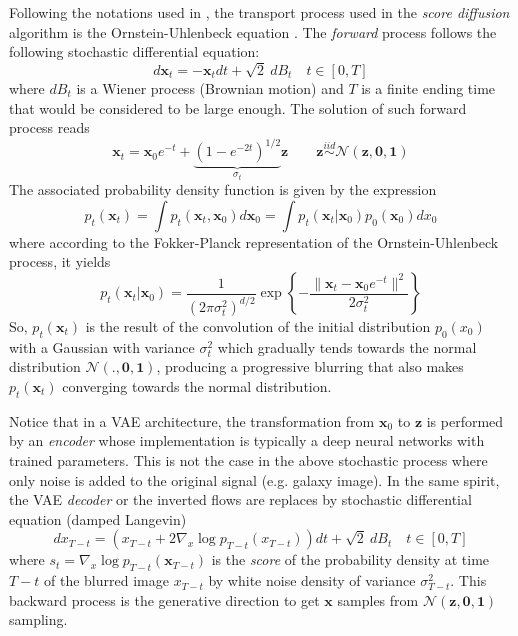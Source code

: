 \documentclass[11pt]{amsart}
\begin{document}
Following the notations used in \cite{kadkhodaie2024generalization}, the transport process used in the \textit{score diffusion} algorithm is the Ornstein-Uhlenbeck equation \citep{Uhlenbeck1930}. The \textit{forward} process follows the following stochastic differential equation:
\begin{equation}
d\bm{x}_t = -\bm{x}_t dt + \sqrt{2}\ dB_t \quad t\in[0,T]
\label{eq-Ornstein-cont}
\end{equation}
where $dB_t$ is a Wiener process (Brownian motion) and $T$ is a finite ending time that would be considered to be large enough. The solution of such forward process reads
\begin{equation}
\bm{x}_t = \bm{x}_0 e^{-t} + \underbrace{(1-e^{-2t})^{1/2}}_{\sigma_t} \bm{z} \qquad \bm{z} \overset{iid}{\sim} \mathcal{N}(\bm{z},\bm{0},\bm{1})
\end{equation}
The associated probability density function is given by the expression 
\begin{equation}
p_t(\bm{x}_t) = \int p_t(\bm{x}_t,\bm{x}_0) d\bm{x}_0 = \int p_t(\bm{x}_t|\bm{x}_0) p_0(\bm{x}_0)dx_0
\label{eq-smoothing-p0-gauss}
\end{equation}
where according to the Fokker-Planck representation of the Ornstein-Uhlenbeck process,  it yields
\begin{equation}
p_t(\bm{x}_t|\bm{x}_0)= \frac{1}{(2\pi \sigma_t^2)^{d/2}}\exp\left\{\displaystyle -\frac{\|\bm{x}_t-\bm{x}_0e^{-t}\|^2}{2\sigma_t^2}\right\}
\end{equation}
So, $p_t(\bm{x}_t)$ is the result of the convolution of the initial distribution $p_0(x_0)$ with a Gaussian with variance $\sigma_t^2$ which gradually tends towards the normal distribution $\mathcal{N}(.,\bm{0},\bm{1})$, producing a progressive blurring that also makes $p_t(\bm{x}_t)$ converging towards the normal distribution. 

Notice that in a VAE architecture,  the transformation from $\bm{x}_0$ to $\bm{z}$ is performed by an \textit{encoder} whose implementation is typically a deep neural networks with trained parameters. This is not the case in the above stochastic process where only noise is added to the original signal (e.g. galaxy image). In the same spirit, the VAE \textit{decoder} or the inverted flows are replaces by stochastic differential equation (damped Langevin)
\begin{equation}
dx_{T-t} = (x_{T-t} + 2\nabla_x \log p_{T-t}(x_{T-t}))dt + \sqrt{2}\ dB_t \quad t\in[0,T]
\label{eq-backward-diffusion}
\end{equation}
where $s_t=\nabla_x \log p_{T-t}(\bm{x}_{T-t})$ is the \textit{score} of the probability density at time $T-t$  of the blurred image $x_{T-t}$ by white noise density of  variance $\sigma^2_{T-t}$. This backward process is the generative direction to get $\bm{x}$ samples from $\mathcal{N}(\bm{z},\bm{0},\bm{1})$ sampling. 
\end{document}
